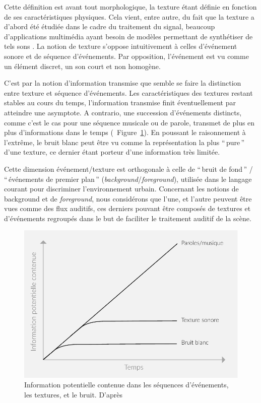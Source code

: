{{Cette définition est avant tout morphologique, la texture étant définie en fonction de ses caractéristiques physiques. Cela vient, entre autre, du fait que la texture a d'abord été étudiée dans le cadre du traitement du signal, beaucoup d'applications multimédia ayant besoin de  modèles permettant de synthétiser de tels sons \citep{schwarz2011state}. La notion de texture s'oppose intuitivement à celles d'événement sonore et de séquence d'événements. Par opposition, l'événement est vu comme un élément discret, un son court et non homogène.

C'est par la notion d'information transmise que semble se faire la distinction entre texture et séquence d'événements. Les caractéristiques des textures restant stables au cours du temps, l'information transmise finit éventuellement par atteindre une asymptote. A contrario, une succession d'événements distincts, comme c'est le cas pour une séquence musicale ou de parole, transmet de plus en plus d'informations dans le temps (\cf~Figure~\ref{fig:texture}). En poussant le raisonnement à l’extrême, le bruit blanc peut être vu comme la représentation la plus ``\,pure\,'' d'une texture, ce dernier étant porteur d'une information très limitée.

Cette dimension événement/texture est orthogonale à celle  de ``\,bruit de fond\,'' / ``\,événements de premier plan\,'' (\emph{background}/\emph{foreground}), utilisée  dans le langage courant pour discriminer l’environnement urbain. Concernant les notions de background et de \emph{foreground}, nous considérons que l'une, et l'autre peuvent être vues comme des flux auditifs, ces derniers pouvant être composés de textures et d’événements regroupés dans le but de faciliter le traitement auditif de la scène.

\begin{figure}[t]
        \myfloatalign
        \includegraphics[width=.8\linewidth]{gfx/ch_3/texture}
        \caption[Information potentielle contenue dans les séquences d'événements, les textures, et le bruit]{Information potentielle contenue dans les séquences d'événements, les textures, et le bruit. D'après \citep{saint1995classification}}\label{fig:texture}
\end{figure}

}}
